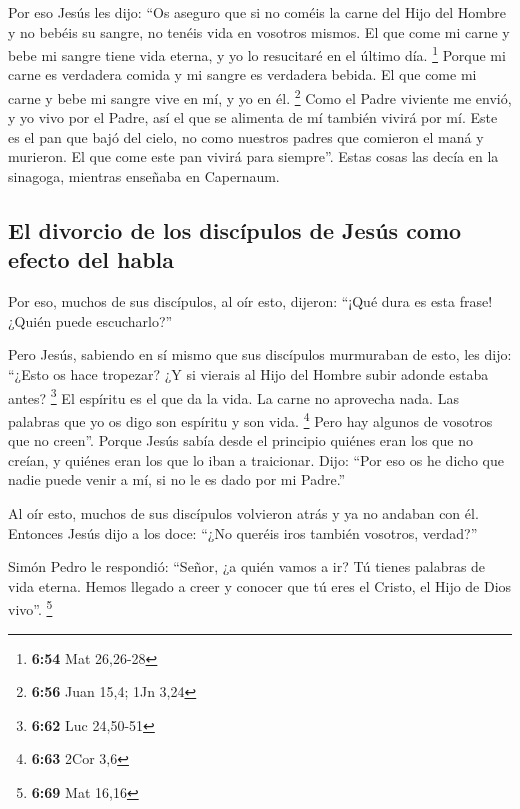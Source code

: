  Por eso Jesús les dijo: ``Os aseguro que si no coméis la
carne del Hijo del Hombre y no bebéis su sangre, no tenéis vida en
vosotros mismos.  El que come mi carne y bebe mi sangre
tiene vida eterna, y yo lo resucitaré en el último día. \footnote{\textbf{6:54}
  Mat 26,26-28}  Porque mi carne es verdadera comida y mi
sangre es verdadera bebida.  El que come mi carne y bebe
mi sangre vive en mí, y yo en él. \footnote{\textbf{6:56} Juan 15,4; 1Jn
  3,24}  Como el Padre viviente me envió, y yo vivo por
el Padre, así el que se alimenta de mí también vivirá por mí.
 Este es el pan que bajó del cielo, no como nuestros
padres que comieron el maná y murieron. El que come este pan vivirá para
siempre''.  Estas cosas las decía en la sinagoga,
mientras enseñaba en Capernaum.

\hypertarget{el-divorcio-de-los-discuxedpulos-de-jesuxfas-como-efecto-del-habla}{%
\subsection{El divorcio de los discípulos de Jesús como efecto del
habla}\label{el-divorcio-de-los-discuxedpulos-de-jesuxfas-como-efecto-del-habla}}

 Por eso, muchos de sus discípulos, al oír esto, dijeron:
``¡Qué dura es esta frase! ¿Quién puede escucharlo?''

 Pero Jesús, sabiendo en sí mismo que sus discípulos
murmuraban de esto, les dijo: ``¿Esto os hace tropezar? 
¿Y si vierais al Hijo del Hombre subir adonde estaba antes? \footnote{\textbf{6:62}
  Luc 24,50-51}  El espíritu es el que da la vida. La
carne no aprovecha nada. Las palabras que yo os digo son espíritu y son
vida. \footnote{\textbf{6:63} 2Cor 3,6}  Pero hay algunos
de vosotros que no creen''. Porque Jesús sabía desde el principio
quiénes eran los que no creían, y quiénes eran los que lo iban a
traicionar.  Dijo: ``Por eso os he dicho que nadie puede
venir a mí, si no le es dado por mi Padre.''

 Al oír esto, muchos de sus discípulos volvieron atrás y
ya no andaban con él.  Entonces Jesús dijo a los doce:
``¿No queréis iros también vosotros, verdad?''

 Simón Pedro le respondió: ``Señor, ¿a quién vamos a ir?
Tú tienes palabras de vida eterna.  Hemos llegado a creer
y conocer que tú eres el Cristo, el Hijo de Dios vivo''. \footnote{\textbf{6:69}
  Mat 16,16}

